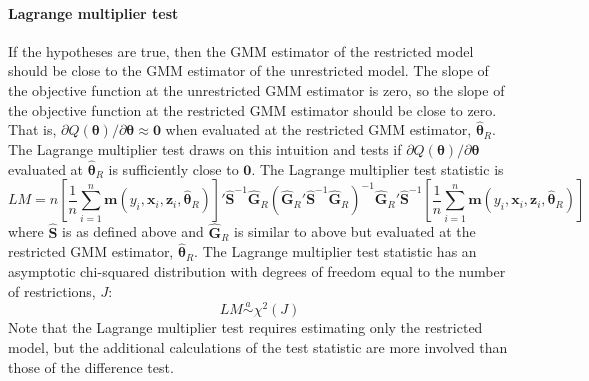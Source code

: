 \documentclass[11pt,letterpaper]{article}
\begin{document}
\paragraph{Lagrange multiplier test} If the hypotheses are true, then the GMM estimator of the restricted model should be close to the GMM estimator of the unrestricted model. The slope of the objective function at the unrestricted GMM estimator is zero, so the slope of the objective function at the restricted GMM estimator should be close to zero. That is, $\partial Q(\bm{\theta}) / \partial \bm{\theta} \approx \bm{0}$ when evaluated at the restricted GMM estimator, $\widehat{\bm{\theta}}_R$. The Lagrange multiplier test draws on this intuition and tests if $\partial Q(\bm{\theta}) / \partial \bm{\theta}$ evaluated at $\widehat{\bm{\theta}}_R$ is sufficiently close to $\bm{0}$. The Lagrange multiplier test statistic is
$$LM = n \left[ \frac{1}{n} \sum_{i = 1}^n \bm{m}(y_i, \bm{x}_i, \bm{z}_i, \widehat{\bm{\theta}}_R) \right]' \widehat{\bm{S}}^{-1} \widehat{\bm{G}}_R \left( \widehat{\bm{G}}_R' \widehat{\bm{S}}^{-1} \widehat{\bm{G}}_R \right)^{-1} \widehat{\bm{G}}_R' \widehat{\bm{S}}^{-1} \left[ \frac{1}{n} \sum_{i = 1}^n \bm{m}(y_i, \bm{x}_i, \bm{z}_i, \widehat{\bm{\theta}}_R) \right]$$
where $\widehat{\bm{S}}$ is as defined above and $\widehat{\bm{G}}_R$ is similar to above but evaluated at the restricted GMM estimator, $\widehat{\bm{\theta}}_R$.
The Lagrange multiplier test statistic has an asymptotic chi-squared distribution with degrees of freedom equal to the number of restrictions, $J$:
$$LM \overset{a}{\sim} \chi^2(J)$$
Note that the Lagrange multiplier test requires estimating only the restricted model, but the additional calculations of the test statistic are more involved than those of the difference test.
\end{document}

